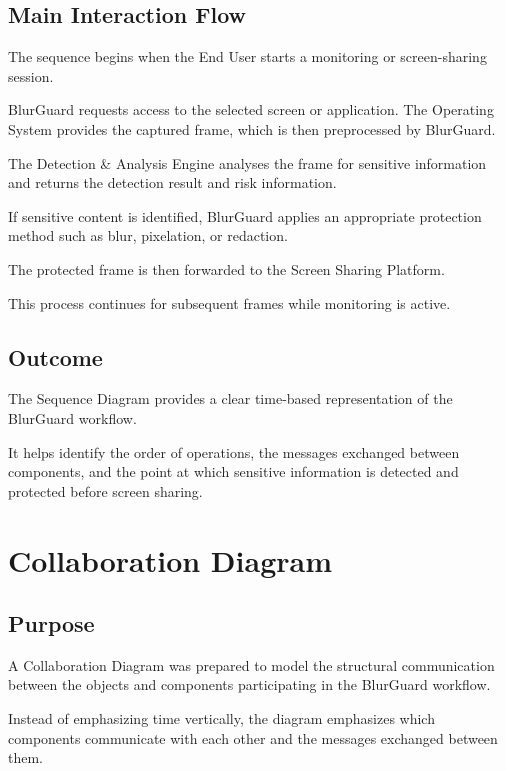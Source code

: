 \documentclass[12pt,a4paper]{article}
\begin{document}
\subsection{Main Interaction Flow}

The sequence begins when the End User starts a monitoring or screen-sharing session.

BlurGuard requests access to the selected screen or application. The Operating System provides the captured frame, which is then preprocessed by BlurGuard.

The Detection \& Analysis Engine analyses the frame for sensitive information and returns the detection result and risk information.

If sensitive content is identified, BlurGuard applies an appropriate protection method such as blur, pixelation, or redaction.

The protected frame is then forwarded to the Screen Sharing Platform.

This process continues for subsequent frames while monitoring is active.

\subsection{Outcome}

The Sequence Diagram provides a clear time-based representation of the BlurGuard workflow.

It helps identify the order of operations, the messages exchanged between components, and the point at which sensitive information is detected and protected before screen sharing.



\section{Collaboration Diagram}

\subsection{Purpose}

A Collaboration Diagram was prepared to model the structural communication between the objects and components participating in the BlurGuard workflow.

Instead of emphasizing time vertically, the diagram emphasizes which components communicate with each other and the messages exchanged between them.
\end{document}
